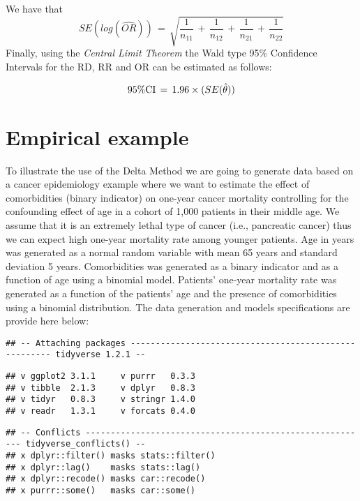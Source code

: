 \documentclass[]{article}
\begin{document}
We have that
\[SE(log(\widehat{OR}))\,=\, \sqrt{\frac{1}{n_{11}}\,+\,\frac{1}{n_{12}}\,+\,\frac{1}{n_{21}}\,+\,\frac{1}{n_{22}}}\]
Finally, using the \emph{Central Limit Theorem} the Wald type 95\%
Confidence Intervals for the RD, RR and OR can be estimated as follows:

\[95\%\text{CI}\,=\,1.96\times\text(SE(\hat\theta))\]

\hypertarget{empirical-example}{%
\section{Empirical example}\label{empirical-example}}

To illustrate the use of the Delta Method we are going to generate data
based on a cancer epidemiology example where we want to estimate the
effect of comorbidities (binary indicator) on one-year cancer mortality
controlling for the confounding effect of age in a cohort of 1,000
patients in their middle age. We assume that it is an extremely lethal
type of cancer (i.e., pancreatic cancer) thus we can expect high
one-year mortality rate among younger patients. Age in years was
generated as a normal random variable with mean 65 years and standard
deviation 5 years. Comorbidities was generated as a binary indicator and
as a function of age using a binomial model. Patients\(’\) one-year
mortality rate was generated as a function of the patients\(’\) age and
the presence of comorbidities using a binomial distribution. The data
generation and models specifications are provide here below:

\begin{verbatim}
## -- Attaching packages ------------------------------------------------------ tidyverse 1.2.1 --
\end{verbatim}

\begin{verbatim}
## v ggplot2 3.1.1     v purrr   0.3.3
## v tibble  2.1.3     v dplyr   0.8.3
## v tidyr   0.8.3     v stringr 1.4.0
## v readr   1.3.1     v forcats 0.4.0
\end{verbatim}

\begin{verbatim}
## -- Conflicts --------------------------------------------------------- tidyverse_conflicts() --
## x dplyr::filter() masks stats::filter()
## x dplyr::lag()    masks stats::lag()
## x dplyr::recode() masks car::recode()
## x purrr::some()   masks car::some()
\end{verbatim}
\end{document}
